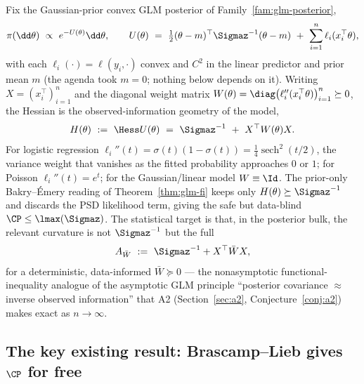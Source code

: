 \documentclass[../../main.tex]{subfiles}
\begin{document}
Fix the Gaussian-prior convex GLM posterior of Family~\ref{fam:glm-posterior},
\[
  \pi(\dd\theta)\ \propto\ e^{-U(\theta)}\dd\theta,
  \qquad
  U(\theta)\ =\ \tfrac12(\theta-m)^\top\Sigmaz^{-1}(\theta-m)\ +\ \sum_{i=1}^n\ell_i(x_i^\top\theta),
\]
with each $\ell_i(\cdot)=\ell(y_i,\cdot)$ convex and $C^2$ in the linear predictor and prior mean
$m$ (the agenda took $m=0$; nothing below depends on it). Writing $X=(x_i^\top)_{i=1}^n$ and the
diagonal weight matrix $W(\theta)=\diag\big(\ell_i''(x_i^\top\theta)\big)_{i=1}^n\succeq0$, the
Hessian is the observed-information geometry of the model,
\begin{equation}\label{eq:a1-hessian}
  H(\theta)\ :=\ \Hess U(\theta)\ =\ \Sigmaz^{-1}\ +\ X^\top W(\theta)X .
\end{equation}
For logistic regression $\ell_i''(t)=\sigma(t)(1-\sigma(t))=\tfrac14\operatorname{sech}^2(t/2)$,
the variance weight that vanishes as the fitted probability approaches $0$ or $1$; for Poisson
$\ell_i''(t)=e^{t}$; for the Gaussian/linear model $W\equiv\Id$. The prior-only Bakry--\'Emery
reading of Theorem~\ref{thm:glm-fi} keeps only $H(\theta)\succeq\Sigmaz^{-1}$ and discards the
PSD likelihood term, giving the safe but data-blind $\CP\le\lmax(\Sigmaz)$. The statistical
target is that, in the posterior bulk, the relevant curvature is not $\Sigmaz^{-1}$ but the full
\begin{equation}\label{eq:a1-target-curv}
  A_{\bar W}\ :=\ \Sigmaz^{-1}+X^\top\bar W X,
\end{equation}
for a deterministic, data-informed $\bar W\succeq0$ --- the nonasymptotic functional-inequality
analogue of the asymptotic GLM principle ``posterior covariance $\approx$ inverse observed
information'' that A2 (Section~\ref{sec:a2}, Conjecture~\ref{conj:a2}) makes exact as $n\to\infty$.

\subsection{The key existing result: Brascamp--Lieb gives \texorpdfstring{$\CP$}{CP} for free}
\label{subsec:a1-bl}
\end{document}
